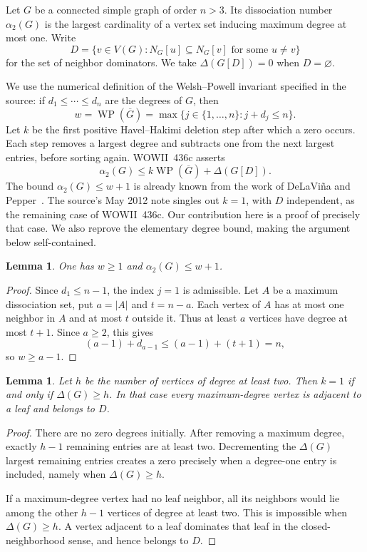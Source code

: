 \documentclass[11pt,a4paper]{article}
\newtheorem{lemma}[theorem]{Lemma}
\theoremstyle{remark}
\begin{document}
Let $G$ be a connected simple graph of order $n>3$.  Its dissociation
number $\alpha_2(G)$ is the largest cardinality of a vertex set inducing
maximum degree at most one.  Write
\[
 D=\{v\in V(G):N_G[u]\subseteq N_G[v]
                    \text{ for some }u\ne v\}
\]
for the set of neighbor dominators.  We take $\Delta(G[D])=0$ when
$D=\varnothing$.

We use the numerical definition of the Welsh--Powell invariant specified
in the source: if $d_1\leq\cdots\leq d_n$ are the degrees of $G$, then
\[
 w=\operatorname{WP}(\overline G)
   =\max\{j\in\{1,\ldots,n\}:j+d_j\leq n\}.
\]
Let $k$ be the first positive Havel--Hakimi deletion step after which a
zero occurs.  Each step removes a largest degree and subtracts one from
the next largest entries, before sorting again.  WOWII~436c asserts
\begin{equation}\label{r3d:436c-original}
 \alpha_2(G)\leq k\operatorname{WP}(\overline G)+\Delta(G[D]).
\end{equation}
The bound $\alpha_2(G)\leq w+1$ is already known from the work of
DeLaVi\~na and Pepper~\cite{DP12}.  The source's May 2012 note singles out
$k=1$, with $D$ independent, as the remaining case of WOWII~436c.
Our contribution here is a proof of precisely that case.  We also reprove
the elementary degree bound, making the argument below self-contained.

\begin{lemma}\label{r3d:wp-bound}
One has $w\geq1$ and $\alpha_2(G)\leq w+1$.
\end{lemma}
\begin{proof}
Since $d_1\leq n-1$, the index $j=1$ is admissible.  Let $A$ be a maximum
dissociation set, put $a=|A|$ and $t=n-a$.  Each vertex of $A$ has at most
one neighbor in $A$ and at most $t$ outside it.  Thus at least $a$ vertices
have degree at most $t+1$.  Since $a\geq2$, this gives
\[
 (a-1)+d_{a-1}\leq (a-1)+(t+1)=n,
\]
so $w\geq a-1$.
\end{proof}

\begin{lemma}\label{r3d:first-zero}
Let $h$ be the number of vertices of degree at least two.  Then
$k=1$ if and only if $\Delta(G)\geq h$.  In that case every maximum-degree
vertex is adjacent to a leaf and belongs to $D$.
\end{lemma}
\begin{proof}
There are no zero degrees initially.  After removing a maximum degree,
exactly $h-1$ remaining entries are at least two.  Decrementing the
$\Delta(G)$ largest remaining entries creates a zero precisely when a
degree-one entry is included, namely when $\Delta(G)\geq h$.

If a maximum-degree vertex had no leaf neighbor, all its neighbors would
lie among the other $h-1$ vertices of degree at least two.  This is
impossible when $\Delta(G)\geq h$.  A vertex adjacent to a leaf dominates
that leaf in the closed-neighborhood sense, and hence belongs to $D$.
\end{proof}
\end{document}
